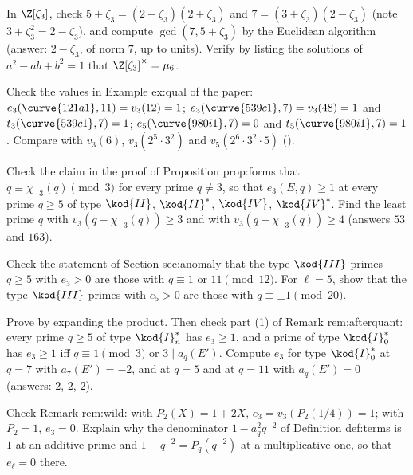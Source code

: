 \begin{exercise}\label{ex:rings:eisenstein-integers}
In $\Z[\zeta_3]$, check $5+\zeta_3=(2-\zeta_3)(2+\zeta_3)$ and $7=(3+\zeta_3)(2-\zeta_3)$ (note $3+\zeta_3^2=2-\zeta_3$), and compute $\gcd(7,5+\zeta_3)$ by the Euclidean algorithm
(answer: $2-\zeta_3$, of norm $7$, up to units). Verify by listing the solutions of $a^2-ab+b^2=1$ that $\Z[\zeta_3]^\times=\mu_6$.
\end{exercise}

\begin{exercise}\label{ex:rings:check-example}
Check the values in Example ex:qual of the paper: $e_3(\curve{121a1},11)=v_3(12)=1$; $e_3(\curve{539c1},7)=v_3(48)=1$ and $t_3(\curve{539c1},7)=1$; $e_5(\curve{980i1},7)=0$
and $t_5(\curve{980i1},7)=1$. Compare with $v_3(6)$, $v_3(2^5\cdot3^2)$ and $v_5(2^6\cdot3^2\cdot5)$ ().
\end{exercise}

\begin{exercise}\label{ex:rings:forms}
Check the claim in the proof of Proposition prop:forms that $q\equiv\chi_{-3}(q)\pmod3$ for every prime $q\ne3$, so that $e_3(E,q)\ge1$ at every prime $q\ge5$ of
type $\kod{II}$, $\kod{II}^*$, $\kod{IV}$, $\kod{IV}^*$. Find the least prime $q$ with $v_3(q-\chi_{-3}(q))\ge3$ and with $v_3(q-\chi_{-3}(q))\ge4$ (answers $53$ and $163$).
\end{exercise}

\begin{exercise}\label{ex:rings:type-three}
Check the statement of Section sec:anomaly that the type $\kod{III}$ primes $q\ge5$ with $e_3>0$ are those with $q\equiv1$ or $11\pmod{12}$. For $\ell=5$, show that the type
$\kod{III}$ primes with $e_5>0$ are those with $q\equiv\pm1\pmod{20}$.
\end{exercise}

\begin{exercise}\label{ex:rings:i0star}
Prove  by expanding the product. Then check part (1) of Remark rem:afterquant: every prime $q\ge5$ of type $\kod{I}_n^*$ has $e_3\ge1$, and a prime of
type $\kod{I}_0^*$ has $e_3\ge1$ iff $q\equiv1\pmod3$ or $3\mid a_q(E')$. Compute $e_3$ for type $\kod{I}_0^*$ at $q=7$ with $a_7(E')=-2$, and at $q=5$ and at $q=11$ with $a_q(E')=0$
(answers: $2$, $2$, $2$).
\end{exercise}

\begin{exercise}\label{ex:rings:wild}
Check Remark rem:wild: with $P_2(X)=1+2X$, $e_3=v_3(P_2(1/4))=1$; with $P_2=1$, $e_3=0$. Explain why the denominator $1-a_q^2q^{-2}$ of Definition def:terms is $1$ at
an additive prime and $1-q^{-2}=P_q(q^{-2})$ at a multiplicative one, so that $e_\ell=0$ there.
\end{exercise}

